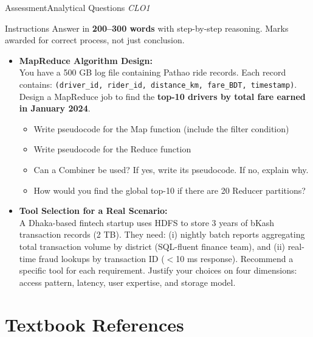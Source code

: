\documentclass[aspectratio=169,10pt]{beamer}
\begin{document}
\begin{frame}{Assessment\textemdash Analytical Questions \hfill\small\textit{CLO1}}
  \begin{block}{Instructions}
    Answer in \textbf{200--300 words} with step-by-step reasoning.  Marks awarded for correct process, not just conclusion.
  \end{block}
  \vspace{6pt}
  \begin{itemize}
    \item[\textbf{A1.}] \textbf{MapReduce Algorithm Design:}\\
    You have a 500 GB log file containing Pathao ride records.  Each record contains: \texttt{(driver\_id, rider\_id, distance\_km, fare\_BDT, timestamp)}.  Design a MapReduce job to find the \textbf{top-10 drivers by total fare earned in January 2024}.
    \begin{itemize}
      \small
      \item Write pseudocode for the Map function (include the filter condition)
      \item Write pseudocode for the Reduce function
      \item Can a Combiner be used?  If yes, write its pseudocode.  If no, explain why.
      \item How would you find the global top-10 if there are 20 Reducer partitions?
    \end{itemize}
  \end{itemize}
  \vspace{6pt}
  \begin{itemize}
    \item[\textbf{A2.}] \textbf{Tool Selection for a Real Scenario:}\\
    A Dhaka-based fintech startup uses HDFS to store 3 years of bKash transaction records (2 TB).  They need: (i) nightly batch reports aggregating total transaction volume by district (SQL-fluent finance team), and (ii) real-time fraud lookups by transaction ID ($<$10 ms response).  Recommend a specific tool for each requirement.  Justify your choices on four dimensions: access pattern, latency, user expertise, and storage model.
  \end{itemize}
\end{frame}

\section*{Textbook References}
\end{document}
